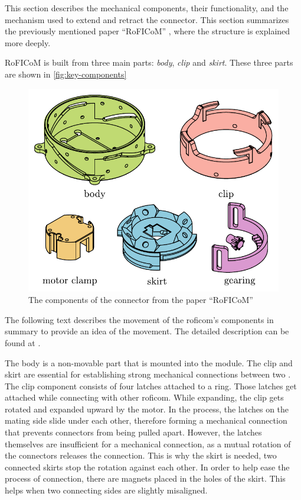 \documentclass[
  digital,     %
  oneside,     %
  nosansbold,  %
  nocolorbold, %
  nolof,         %
  nolot,         %
]{fithesis4}
\begin{document}
This section describes the mechanical components, their functionality, and the mechanism used to extend and retract the connector. This section summarizes the previously mentioned paper ``RoFICoM'' \cite{MrazekBarnat2019Roficom}, where the structure is explained more deeply.

RoFICoM is built from three main parts: \emph{body}, \emph{clip} and \emph{skirt}. These three parts are shown in \autoref{fig:key-components}

\begin{figure}[ht]
    \includegraphics{ dock_components.pdf }
    \caption{ The components of the connector from the paper ``RoFICoM'' \cite{MrazekBarnat2019Roficom} }
    \label{fig:key-components}
\end{figure}

The following text describes the movement of the \acrshort{roficom}'s components in summary to provide an idea of the movement. The detailed description can be found at \cite[p.~10--13]{Mrazek2019thesis}.

The body is a non-movable part that is mounted into the module.
The clip and skirt are essential for establishing strong mechanical connections between two .
The clip component consists of four latches attached to a ring. Those latches get attached while connecting with
other \acrshort{roficom}. While expanding, the clip gets rotated and expanded upward by the motor. In the process, the latches on the mating
side slide under each other, therefore forming a mechanical connection that prevents connectors from being pulled apart.
However, the latches themselves are insufficient for a mechanical connection, as a mutual rotation of the connectors releases
the connection. This is why the skirt is needed, two connected skirts stop the rotation against each other. In order to help ease the process of connection, there are magnets placed in the holes of the skirt. This helps when two connecting sides are slightly misaligned.
\end{document}
